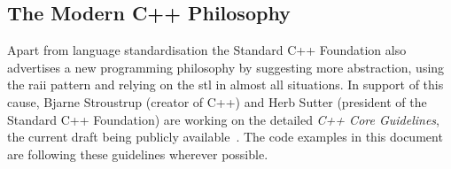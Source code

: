 \subsection{The Modern C++ Philosophy}\label{intro:philosophy}

Apart from language standardisation the Standard C++ Foundation also advertises a new programming philosophy by suggesting more abstraction, using the \gls{raii} pattern and relying on the \gls{stl} in almost all situations. In support of this cause, Bjarne Stroustrup (creator of C++) and Herb Sutter (president of the Standard C++ Foundation) are working on the detailed \textit{C++ Core Guidelines}, the current draft being publicly available~\cite{cpp_guidelines}. The code examples in this document are following these guidelines wherever possible.